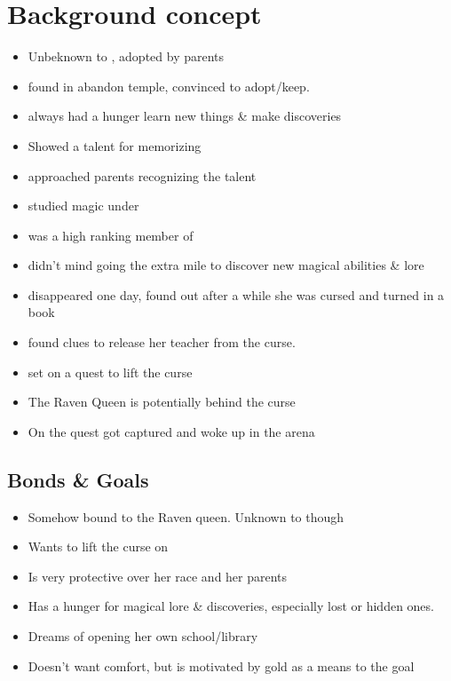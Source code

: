     \section{Background concept}
    \begin{itemize}
        \item Unbeknown to \Name{}, adopted by parents
        \item \Mom{} found \Name{} in abandon temple, convinced \Dad{} to adopt/keep.
        \item \Name{} always had a hunger learn new things \& make discoveries
        \item \Name{} Showed a talent for memorizing
        \item \MasterFullName{} approached parents recognizing the talent
        \item \Name{} studied magic under \Master{}
        \item \Master{} was a high ranking member of \CloisterIntro{}
        \item \Name{} didn't mind going the extra mile to discover new magical abilities \& lore
        \item \Master{} disappeared one day, \Name{} found out after a while she was cursed and turned in a book
        \item \Name{} found clues to release her teacher from the curse.
        \item \Name{} set on a quest to lift the curse
        \item The Raven Queen is potentially behind the curse
        \item On the quest \Name{} got captured and woke up in the arena
    \end{itemize}


    \subsection{Bonds \& Goals}
    \begin{itemize}
        \item Somehow bound to the Raven queen. Unknown to \Name{} though
        \item Wants to lift the curse on \MasterFullName{}
        \item Is very protective over her race and her parents
        \item Has a hunger for magical lore \& discoveries, especially lost or hidden ones.
        \item Dreams of opening her own school/library
        \item Doesn't want comfort, but is motivated by gold as a means to the goal
    \end{itemize}

